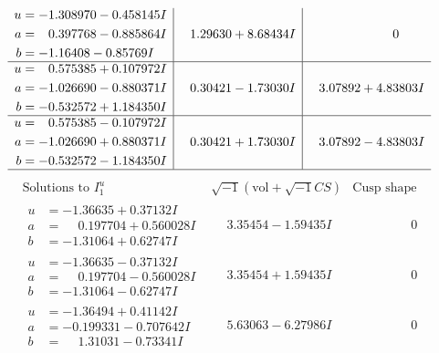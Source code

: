 \documentclass[1p]{elsarticle_modified}
\theoremstyle{definition}
\newcommand{\I}{\sqrt{-1}}
\begin{document}
$$\begin{array}{c|c|c}
\begin{aligned}
u &= -1.308970 - 0.458145 I \\
a &= \phantom{-}0.397768 - 0.885864 I \\
b &= -1.16408 - 0.85769 I\end{aligned}
 & \phantom{-}1.29630 + 8.68434 I & \phantom{-0.000000 } 0 \\ \hline\begin{aligned}
u &= \phantom{-}0.575385 + 0.107972 I \\
a &= -1.026690 - 0.880371 I \\
b &= -0.532572 + 1.184350 I\end{aligned}
 & \phantom{-}0.30421 - 1.73030 I & \phantom{-}3.07892 + 4.83803 I \\ \hline\begin{aligned}
u &= \phantom{-}0.575385 - 0.107972 I \\
a &= -1.026690 + 0.880371 I \\
b &= -0.532572 - 1.184350 I\end{aligned}
 & \phantom{-}0.30421 + 1.73030 I & \phantom{-}3.07892 - 4.83803 I\\
 \hline 
 \end{array}$$\newpage$$\begin{array}{c|c|c}  
\text{Solutions to }I^u_{1}& \I (\text{vol} + \sqrt{-1}CS) & \text{Cusp shape}\\
 \hline 
\begin{aligned}
u &= -1.36635 + 0.37132 I \\
a &= \phantom{-}0.197704 + 0.560028 I \\
b &= -1.31064 + 0.62747 I\end{aligned}
 & \phantom{-}3.35454 - 1.59435 I & \phantom{-0.000000 } 0 \\ \hline\begin{aligned}
u &= -1.36635 - 0.37132 I \\
a &= \phantom{-}0.197704 - 0.560028 I \\
b &= -1.31064 - 0.62747 I\end{aligned}
 & \phantom{-}3.35454 + 1.59435 I & \phantom{-0.000000 } 0 \\ \hline\begin{aligned}
u &= -1.36494 + 0.41142 I \\
a &= -0.199331 - 0.707642 I \\
b &= \phantom{-}1.31031 - 0.73341 I\end{aligned}
 & \phantom{-}5.63063 - 6.27986 I & \phantom{-0.000000 } 0 \\ \hline\begin{aligned}

\end{aligned}
\end{array}$$
\end{document}
